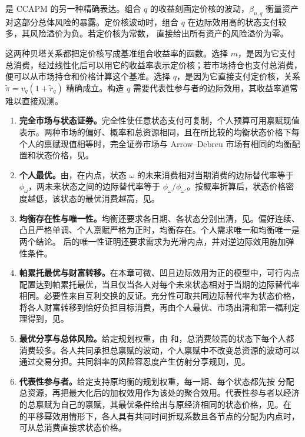  是 CCAPM 的另一种精确表达。组合 $q$ 的收益刻画定价核的波动，$\beta_{n,q}$ 衡量资产对这部分总体风险的暴露。定价核波动时，组合 $q$ 在边际效用高的状态支付较多，其风险溢价为负。若定价核为常数， 直接给出所有资产的风险溢价为零。

这两种贝塔关系都把定价核写成基准组合收益率的函数。选择 $m$，是因为它支付总消费，经过线性化后可以用它的收益率表示定价核；若市场持仓也支付总消费，便可以从市场持仓和价格计算这个基准。选择 $q$，是因为它直接支付定价核，关系 $\widetilde\pi=v_q(1+\tilde r_q)$ 精确成立。构造 $q$ 需要代表性参与者的边际效用，其收益率通常难以直接观测。

\WJChapterSummary
\begin{tcolorbox}[summary,title=从完全市场到消费定价]
\begin{enumerate}
 \item \textbf{完全市场与状态证券。}完全性使任意状态支付可复制，个人预算可用禀赋现值表示。两种市场的偏好、概率和总资源相同，且在所比较的均衡状态价格下每个人的禀赋现值相等时，完全证券市场与 Arrow--Debreu 市场有相同的均衡配置和状态价格，见。
 \item \textbf{个人最优。}由，在内点，状态 $\omega$ 的未来消费相对当期消费的边际替代率等于 $\phi_\omega$，两未来状态之间的边际替代率等于 $\phi_\omega/\phi_{\omega'}$。按概率折算后，状态价格密度越低，该状态的最优消费越高，见。
 \item \textbf{均衡存在性与唯一性。}均衡还要求各日期、各状态分别出清，见。偏好连续、凸且严格单调、个人禀赋严格为正时，均衡存在。个人需求唯一和均衡唯一是两个结论。 后的唯一性证明还要求需求为光滑内点，并对逆边际效用施加弹性条件。
 \item \textbf{帕累托最优与财富转移。}在本章可微、凹且边际效用为正的模型中，可行内点配置达到帕累托最优，当且仅当各人对每个未来状态相对于当期的边际替代率相同。必要性来自互利交换的反证。充分性可取共同边际替代率为状态价格，将各人财富转移到恰好负担目标消费，再由个人最优、市场出清和第一福利定理得到，见。
 \item \textbf{最优分享与总体风险。}给定规划权重，由 和，总消费较高的状态下每个人都消费较多。各人共同承担总禀赋的波动，个人禀赋中不改变总资源的波动可以通过交易分担。共同斜率的风险容忍度产生仿射分享规则，见。
 \item \textbf{代表性参与者。}给定支持原均衡的规划权重，每一期、每个状态都先按 分配总资源，再把最大化后的加权效用作为该处的聚合效用。代表性参与者以经济的总禀赋为自己的禀赋，其最优条件给出与原经济相同的状态价格，见。在 的平移幂效用情形下，各人具有共同时间折现系数且各节点的分配为内点时，可从总消费直接求状态价格。

\end{enumerate}
\end{tcolorbox}
